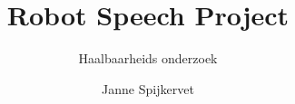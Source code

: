\documentclass[dutch]{mimosis}
\title{Robot Speech Project}
\subtitle{Haalbaarheids onderzoek}
\author{Janne Spijkervet}
\begin{document}
\frontmatter
  
  
  \tableofcontents
\mainmatter










\backmatter

\begingroup
\let\clearpage\relax
\glsaddall
\printglossary[type=\acronymtype]
\endgroup

\label{section:bibliography}
\printbibliography
\end{document}
